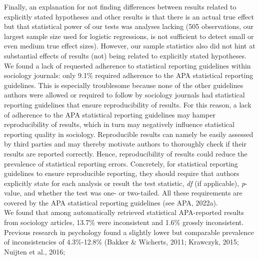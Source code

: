\documentclass[
  12pt,
]{article}
\begin{document}
Finally, an explanation for not finding differences between results
related to explicitly stated hypotheses and other results is that there
is an actual true effect but that statistical power of our tests was
analyses lacking (505 observations, our largest sample size used for
logistic regressions, is not sufficient to detect small or even medium
true effect sizes). However, our sample statistics also did not hint at
substantial effects of results (not) being related to explicitly stated
hypotheses. ~\\
\hspace*{0.333em}\hspace*{0.333em}\hspace*{0.333em}\hspace*{0.333em}We
found a lack of requested adherence to statistical reporting guidelines
within sociology journals: only 9.1\% required adherence to the APA
statistical reporting guidelines. This is especially troublesome because
none of the other guidelines authors were allowed or required to follow
by sociology journals had statistical reporting guidelines that ensure
reproducibility of results. For this reason, a lack of adherence to the
APA statistical reporting guidelines may hamper reproducibility of
results, which in turn may negatively influence statistical reporting
quality in sociology. Reproducible results can namely be easily assessed
by third parties and may thereby motivate authors to thoroughly check if
their results are reported correctly. Hence, reproducibility of results
could reduce the prevalence of statistical reporting errors. Concretely,
for statistical reporting guidelines to ensure reproducible reporting,
they should require that authors explicitly state for each analysis or
result the test statistic, \emph{df} (if applicable), \emph{p}-value,
and whether the test was one- or two-tailed. All these requirements are
covered by the APA statistical reporting guidelines (see APA, 2022a).~\\
\hspace*{0.333em}\hspace*{0.333em}\hspace*{0.333em}\hspace*{0.333em}We
found that among automatically retrieved statistical APA-reported
results from sociology articles, 13.7\% were inconsistent and 1.6\%
grossly inconsistent. Previous research in psychology found a slightly
lower but comparable prevalence of inconsistencies of 4.3\%-12.8\%
(Bakker \& Wicherts, 2011; Krawczyk, 2015; Nuijten et al., 2016;
\end{document}
